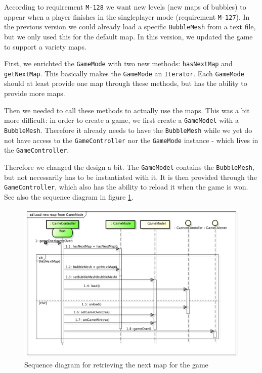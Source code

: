 \documentclass[a4paper]{article}
\begin{document}
According to requirement \texttt{M-128} we want new levels (new maps of bubbles) to appear when a player finishes in the singleplayer mode (requirement \texttt{M-127}). In the previous version we could already load a specific \texttt{BubbleMesh} from a text file, but we only used this for the default map. In this version, we updated the game to support a variety maps.

\par{} First, we enrichted the \texttt{GameMode} with two new methods: \texttt{hasNextMap} and \texttt{getNextMap}. This basically makes the \texttt{GameMode} an \texttt{Iterator}. Each \texttt{GameMode} should at least provide one map through these methods, but has the ability to provide more maps.

\par{} Then we needed to call these methods to actually use the maps. This was a bit more difficult: in order to create a game, we first create a \texttt{GameModel} with a \texttt{BubbleMesh}. Therefore it already needs to have the \texttt{BubbleMesh} while we yet do not have access to the \texttt{GameController} nor the \texttt{GameMode} instance - which lives in the \texttt{GameController}.

\par{} Therefore we changed the design a bit. The \texttt{GameModel} contains the \texttt{BubbleMesh}, but not necessarily has to be instantiated with it. It is then provided through the \texttt{GameController}, which also has the ability to reload it when the game is won. See also the sequence diagram in figure \ref{fig:GameModeMap}.

\begin{figure}[H]
	\centering
	\includegraphics[scale=0.4]{GameModeMap.png}
    \caption{Sequence diagram for retrieving the next map for the game}
    \label{fig:GameModeMap}
\end{figure}
\end{document}
